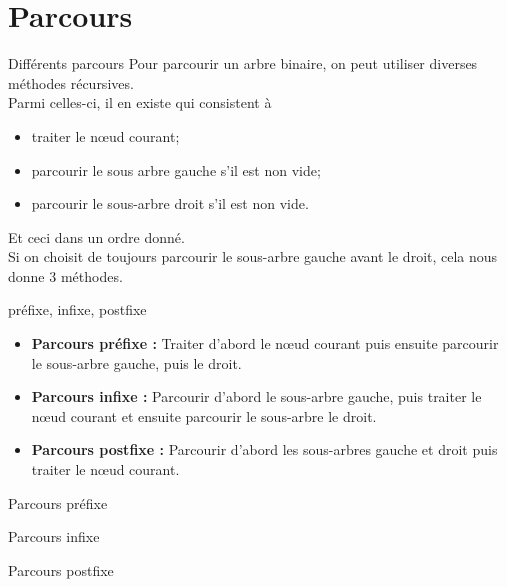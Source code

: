 \documentclass[10pt]{beamer}
\begin{document}
\section{Parcours}
\begin{frame}{Différents parcours}
Pour parcourir un arbre binaire, on peut utiliser diverses méthodes récursives.\\
Parmi celles-ci, il en existe qui consistent à\\ 
\begin{itemize}
    \item traiter le n\oe ud courant;\\
    \item parcourir le sous arbre gauche s'il est non vide;\\
    \item parcourir le sous-arbre droit s'il est non vide.\\
\end{itemize}
Et ceci \alert{dans un ordre donné}.\\
Si on choisit de toujours parcourir le sous-arbre gauche avant le droit, cela nous donne 3 méthodes.
\end{frame}
\begin{frame}{préfixe, infixe, postfixe}
\begin{itemize}
    \item \textbf{Parcours préfixe :} Traiter d'abord le n\oe ud courant puis ensuite parcourir le sous-arbre gauche, puis le droit.\pause
    \item \textbf{Parcours infixe :} Parcourir d'abord le  sous-arbre gauche, puis traiter le n\oe ud courant et ensuite parcourir le sous-arbre le droit.\pause
    \item  \textbf{Parcours postfixe :} Parcourir d'abord les sous-arbres gauche et droit puis traiter le n\oe ud courant.
\end{itemize}
\end{frame}

\begin{frame}{Parcours préfixe}
    \begin{center}
    \end{center}
\end{frame}
\begin{frame}{Parcours infixe}
    \begin{center}
    \end{center}
\end{frame}
\begin{frame}{Parcours postfixe}
    \begin{center}
    \end{center}
\end{frame}
\end{document}
